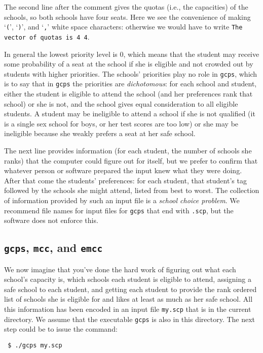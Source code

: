 \documentclass[12pt]{article}
\theoremstyle{definition}
\begin{document}
The second line after the comment gives the quotas (i.e., the
capacities) of the schools, so both schools have four seats.
Here we see the convenience of making `\texttt{(}', `\texttt{)}', and
`\texttt{,}' white space characters: otherwise we would have to write
\texttt{The vector of quotas is 4 4}.

In general the lowest priority level is 0, which means that the
student may receive some probability of a seat at the school if she is
eligible and not crowded out by students with higher priorities.  The
schools' priorities play no role in \texttt{gcps}, which is to say
that in \texttt{gcps} the priorities are \emph{dichotomous}: for each
school and student, either the student is eligible to attend the
school (and her preferences rank that school) or she is not, and the
school gives equal consideration to all eligible students.  A student
may be ineligible to attend a school if she is not qualified (it is a
single sex school for boys, or her test scores are too low) or she may
be ineligible because she weakly prefers a seat at her safe school.

The next line provides information (for each student, the number of
schools she ranks) that the computer could figure out for itself, but
we prefer to confirm that whatever person or software prepared the
input knew what they were doing.  After that come the students'
preferences: for each student, that student's tag followed by the
schools she might attend, listed from best to worst.  The collection
of information provided by such an input file is a \emph{school choice
problem}.  We recommend file names for input files for \texttt{gcps}
that end with \texttt{.scp}, but the software does not enforce this.

\subsection{\texttt{gcps}, \texttt{mcc}, and \texttt{emcc}}

We now imagine that you've done the hard work of figuring out what
each school's capacity is, which schools each student is eligible to
attend, assigning a safe school to each student, and getting each
student to provide the rank ordered list of schools she is eligible
for and likes at least as much as her safe school.  All this
information has been encoded in an input file \texttt{my.scp} that is
in the current directory.  We assume that the executable \texttt{gcps}
is also in this directory.  The next step could be to issue the
command:
\begin{obeylines}
  \texttt{
    \$ ./gcps my.scp 
    }
\end{obeylines}
\bigskip
\end{document}
